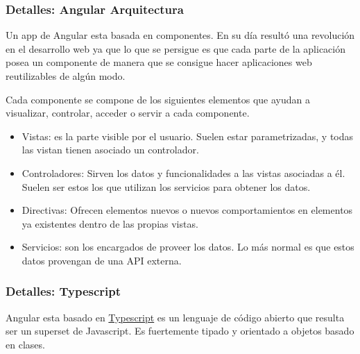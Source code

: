  

\subsubsection{Detalles: Angular Arquitectura}\label{detalle_angulararquitectura}
Un app de Angular esta basada en componentes. En su día resultó una revolución en el desarrollo web ya que lo que se persigue es que cada parte de la aplicación posea un componente de manera que se consigue hacer aplicaciones web reutilizables de algún modo.


Cada componente se compone de los siguientes elementos que ayudan a visualizar, controlar, acceder o servir a cada componente. 

\begin{itemize}
\tightlist
\item
Vistas: es la parte visible por el usuario. Suelen estar parametrizadas, y todas
las vistan tienen asociado un controlador.
\item
 Controladores: Sirven los datos y funcionalidades a las vistas asociadas a él. Suelen ser estos los que utilizan los servicios para obtener los datos.
\item
 Directivas: Ofrecen elementos nuevos o nuevos comportamientos en elementos ya existentes dentro de las propias vistas.
  \item
  Servicios: son los encargados de proveer los datos. Lo más normal es que estos datos provengan de una API externa.
\end{itemize}


\subsubsection{Detalles: Typescript}\label{detalle_typescript}
Angular esta basado en  \href{https://es.wikipedia.org/wiki/TypeScript}{Typescript}  es un lenguaje de código abierto que resulta ser un superset de Javascript. Es fuertemente tipado y orientado a objetos basado en clases.


